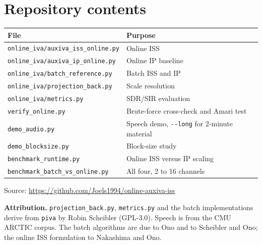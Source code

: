 \documentclass[11pt,a4paper]{article}
\begin{document}
\section{Repository contents}

\begin{table}[h]
\centering
\begin{tabular}{ll}
\toprule
File & Purpose \\
\midrule
\texttt{online\_iva/auxiva\_iss\_online.py} & Online ISS \\
\texttt{online\_iva/auxiva\_ip\_online.py} & Online IP baseline \\
\texttt{online\_iva/batch\_reference.py} & Batch ISS and IP \\
\texttt{online\_iva/projection\_back.py} & Scale resolution \\
\texttt{online\_iva/metrics.py} & SDR/SIR evaluation \\
\texttt{verify\_online.py} & Brute-force cross-check and Amari test \\
\texttt{demo\_audio.py} & Speech demo, \texttt{-{}-long} for 2-minute material \\
\texttt{demo\_blocksize.py} & Block-size study \\
\texttt{benchmark\_runtime.py} & Online ISS versus IP scaling \\
\texttt{benchmark\_batch\_vs\_online.py} & All four, 2 to 16 channels \\
\bottomrule
\end{tabular}
\end{table}

\vspace{1em}
\noindent
Source: \url{https://github.com/Joels1994/online-auxiva-iss}

\vspace{0.6em}
\noindent
\textbf{Attribution.} \texttt{projection\_back.py}, \texttt{metrics.py} and the
batch implementations derive from \texttt{piva} by Robin Scheibler (GPL-3.0).
Speech is from the CMU ARCTIC corpus. The batch algorithms are due to Ono and to
Scheibler and Ono; the online ISS formulation to Nakashima and Ono.
\end{document}
